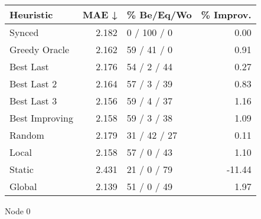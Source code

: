 \begin{tabular}{lrlr}
\toprule
\textbf{Heuristic} & \textbf{MAE ↓} & \textbf{\% Be/Eq/Wo} & \textbf{\% Improv.} \\
\midrule
            Synced &          2.182 &          0 / 100 / 0 &                0.00 \\
     Greedy Oracle &          2.162 &          59 / 41 / 0 &                0.91 \\
         Best Last &          2.176 &          54 / 2 / 44 &                0.27 \\
       Best Last 2 &          2.164 &          57 / 3 / 39 &                0.83 \\
       Best Last 3 &          2.156 &          59 / 4 / 37 &                1.16 \\
    Best Improving &          2.158 &          59 / 3 / 38 &                1.09 \\
            Random &          2.179 &         31 / 42 / 27 &                0.11 \\
             Local &          2.158 &          57 / 0 / 43 &                1.10 \\
            Static &          2.431 &          21 / 0 / 79 &              -11.44 \\
            Global &          2.139 &          51 / 0 / 49 &                1.97 \\
\bottomrule
\end{tabular}
\caption{Node 0}
\label{tab:ds_iid_lr01_le1_bs2_0}

